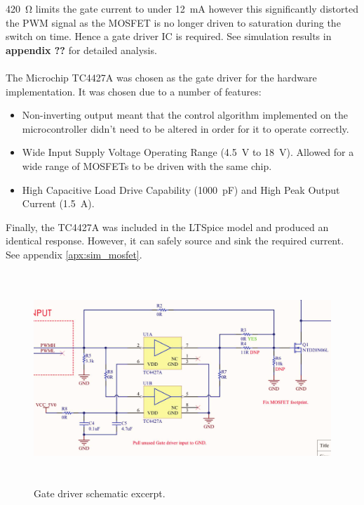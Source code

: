 \SI{420}{\ohm} limits the gate current to under \SI{12}{mA} however this significantly distorted the PWM signal as the MOSFET is no longer driven to saturation during the switch on time. Hence a gate driver IC is required. See simulation results in \textbf{appendix ??} for detailed analysis. 
\\ \\
The Microchip TC4427A was chosen as the gate driver for the hardware implementation. It was chosen due to a number of features:
\begin{itemize}
    \item Non-inverting output meant that the control algorithm implemented on the microcontroller didn’t need to be altered in order for it to operate correctly.
    \item Wide Input Supply Voltage Operating Range (\SI{4.5}{V} to \SI{18}{V}). Allowed for a wide range of MOSFETs to be driven with the same chip.
    \item High Capacitive Load Drive Capability (\SI{1000}{pF}) and High Peak Output Current (\SI{1.5}{A}).
\end{itemize}
Finally, the TC4427A was included in the LTSpice model and produced an identical response. However, it can safely source and sink the required current. See appendix \ref{apx:sim_mosfet}.
\begin{figure}[H]
    \centering
    \includegraphics[height = 8cm]{figures/hardware/gate_driver_schematic.pdf}
    \caption{Gate driver schematic excerpt.}
    \label{fig:gate_driver}
\end{figure}